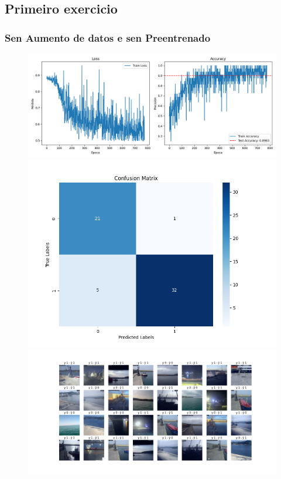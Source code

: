 \documentclass{article}
\begin{document}
\subsection{Primeiro exercicio}
\subsubsection{Sen Aumento de datos e sen Preentrenado}
\begin{figure}[H]
    \centering
    \begin{minipage}{0.55\textwidth}
        \centering
        \includegraphics[width=\linewidth]{../figures/LOSS__A_False_P_False_D_False_MLP_True_efficientnet_b4.png}
    \end{minipage}
    \begin{minipage}{0.3\textwidth}
        \centering
        \includegraphics[width=\linewidth]{../figures/CM__A_False_P_False_D_False_MLP_True_efficientnet_b4.png}
    \end{minipage}
    \begin{minipage}{0.7\textwidth}
        \centering
        \includegraphics[width=\linewidth]{../figures/GRID__A_False_P_False_D_False_MLP_True_efficientnet_b4.png}

\end{minipage}
\end{figure}
\end{document}
